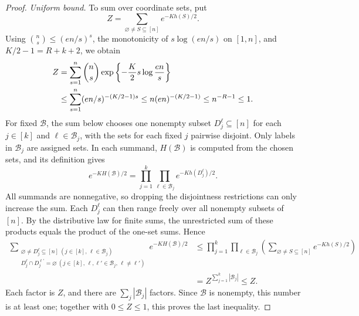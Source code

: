 \documentclass[11pt,reqno]{amsart}
\numberwithin{equation}{section}
\theoremstyle{definition}
\theoremstyle{remark}
\begin{document}
\begin{proof}
\smallskip\noindent\emph{Uniform bound.}
To sum over coordinate sets, put
\[
 Z=\sum_{\varnothing\ne S\subseteq[n]}e^{-K h(S)/2}.
\]
Using $\binom ns\le(en/s)^s$, the monotonicity of $s\log(en/s)$ on
$[1,n]$, and $K/2-1=R+k+2$, we obtain
\begin{align}
 Z
 &=\sum_{s=1}^n\binom ns
       \exp\left\{-\frac K2s\log\frac{en}{s}\right\}\notag\\
 &\le\sum_{s=1}^n(en/s)^{-(K/2-1)s}
 \le n(en)^{-(K/2-1)}
 \le n^{-R-1}\le1.
 \label{eq:Z}
\end{align}
For fixed $\mathcal B$, the sum below chooses one nonempty subset
$D_j^\ell\subseteq[n]$ for each $j\in[k]$ and $\ell\in\mathcal B_j$,
with the sets for each fixed $j$ pairwise disjoint. Only labels in
$\mathcal B_j$ are assigned sets. In each summand, $H(\mathcal B)$
is computed from the chosen sets, and its definition gives
\[
 e^{-K H(\mathcal B)/2}
 =\prod_{j=1}^k\prod_{\ell\in\mathcal B_j}e^{-K h(D_j^\ell)/2}.
\]
All summands are nonnegative, so dropping the disjointness restrictions
can only increase the sum. Each $D_j^\ell$ can then range freely over
all nonempty subsets of $[n]$. By the distributive law for finite sums,
the unrestricted sum of these products equals the product of the
one-set sums. Hence
\begin{align*}
 \sum_{\substack{\varnothing\ne D_j^\ell\subseteq[n]\ (j\in[k],\,\ell\in\mathcal B_j)\\
                  D_j^\ell\cap D_j^{\ell'}=\varnothing\ (j\in[k],\,\ell,\ell'\in\mathcal B_j,\,\ell\ne\ell')}}
       e^{-K H(\mathcal B)/2}
 &\le\prod_{j=1}^k\prod_{\ell\in\mathcal B_j}
       \left(\sum_{\varnothing\ne S\subseteq[n]}e^{-K h(S)/2}\right)\\
 &=Z^{\sum_{j=1}^k|\mathcal B_j|}\le Z.
\end{align*}
Each factor is $Z$, and there are $\sum_j|\mathcal B_j|$ factors.
Since $\mathcal B$ is nonempty, this number is at least one;
together with $0\le Z\le1$, this proves the last inequality.


\end{proof}
\end{document}
